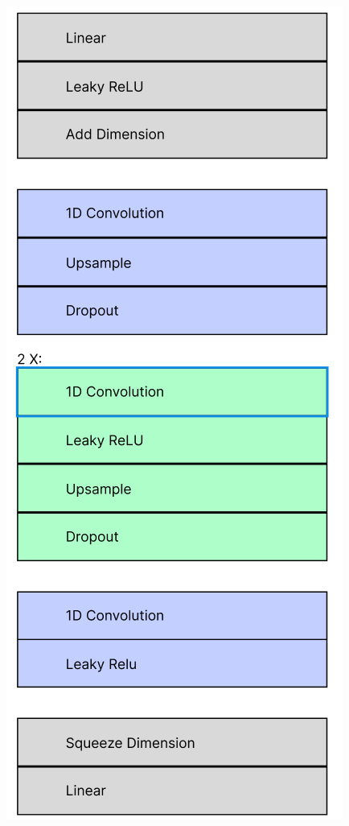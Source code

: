 \documentclass{article}
\begin{document}
\begin{center}
    \includegraphics[scale=0.3]{generator-graphic-v1.png}
\end{center}
\end{document}
